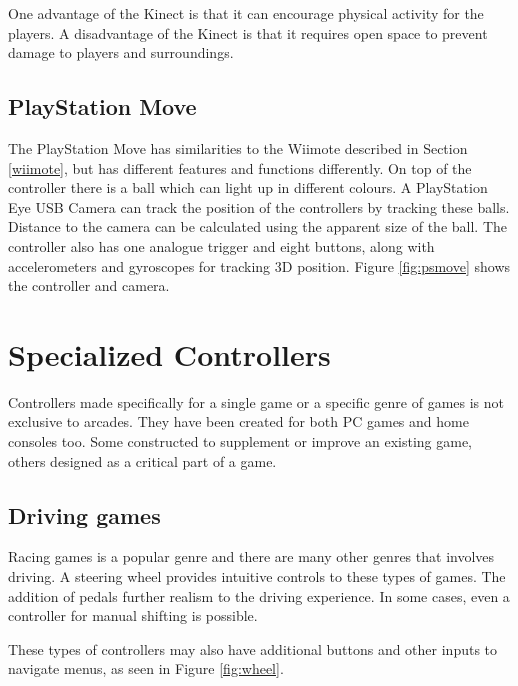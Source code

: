 
One advantage of the Kinect is that it can encourage physical activity for the players.
A disadvantage of the Kinect is that it requires open space to prevent damage to players and surroundings.

\subsection{PlayStation Move}
\label{sec:psmove}
The PlayStation Move has similarities to the Wiimote described in Section \ref{wiimote}, but has different features and functions differently.
On top of the controller there is a ball which can light up in different colours.
A PlayStation Eye USB Camera can track the position of the controllers by tracking these balls.
Distance to the camera can be calculated using the apparent size of the ball.
The controller also has one analogue trigger and eight buttons, along with accelerometers and gyroscopes for tracking 3D position.
Figure \ref{fig:psmove} shows the controller and camera.


\section{Specialized Controllers}
Controllers made specifically for a single game or a specific genre of games is not exclusive to arcades.
They have been created for both PC games and home consoles too.
Some constructed to supplement or improve an existing game, others designed as a critical part of a game.

\subsection{Driving games}
Racing games is a popular genre and there are many other genres that involves driving.
A steering wheel provides intuitive controls to these types of games.
The addition of pedals further realism to the driving experience.
In some cases, even a controller for manual shifting is possible.

These types of controllers may also have additional buttons and other inputs to navigate menus, as seen in Figure \ref{fig:wheel}.


